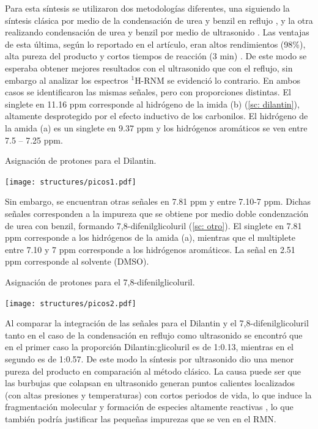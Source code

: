 \documentclass[fleqn,10pt]{SelfArx}
\begin{document}
Para esta síntesis se utilizaron dos metodologías diferentes, una siguiendo la síntesis clásica por medio de la condensación de urea y benzil en reflujo \cite{dunnavant1956}\cite{triovi2015}\cite{safari2010}, y la otra realizando condensación de urea y benzil por medio de ultrasonido \cite{safari2010}.  Las ventajas de esta última, según lo reportado en el artículo, eran altos rendimientos (98\%), alta pureza del producto y cortos tiempos de reacción (3 min) \cite{safari2010}. De este modo se esperaba obtener mejores resultados con el ultrasonido que con el reflujo, sin embargo al analizar los espectros $^1$H-RNM se evidenció lo contrario. En ambos casos se identificaron las mismas señales, pero con proporciones distintas.  El singlete en 11.16 ppm corresponde al hidrógeno de la imida (b) (\autoref{sc: dilantin}), altamente desprotegido por el efecto inductivo de los carbonilos. El hidrógeno de la amida (a) es un singlete en 9.37 ppm y los hidrógenos aromáticos se ven entre 7.5 – 7.25 ppm.
\begin{scheme}[h]
	\centering
	\caption{Asignaci\'on de protones para el Dilantin.}
	\label{sc: dilantin}
	\texttt{[image: structures/picos1.pdf]}
\end{scheme}

Sin embargo, se encuentran otras señales en 7.81 ppm y entre 7.10-7 ppm. Dichas señales corresponden a la impureza que se obtiene por medio doble condenzación de urea con benzil, formando 7,8-difenilglicoluril (\autoref{sc: otro}). El singlete en 7.81 ppm corresponde a los hidrógenos de la amida (a), mientras que el multiplete entre 7.10 y 7 ppm corresponde a los hidrógenos aromáticos. La señal en 2.51 ppm corresponde al solvente (DMSO).
\begin{scheme}[h]
	\centering
	\caption{Asignaci\'on de protones para el 7,8-difenilglicoluril.}
	\label{sc: otro}
	\texttt{[image: structures/picos2.pdf]}
\end{scheme}

Al comparar la integración de las señales para el Dilantin y el 7,8-difenilglicoluril tanto en el caso de la condensación en reflujo como ultrasonido se encontró que en el primer caso la proporción Dilantin:glicoluril es de 1:0.13, mientras en el segundo es de 1:0.57. De este modo la síntesis por ultrasonido dio una menor pureza del producto en comparación al método clásico. La causa puede ser que las burbujas que colapsan en ultrasonido generan puntos calientes localizados (con altas presiones y temperaturas) con cortos periodos de vida, lo que induce la fragmentación molecular y formación de especies altamente reactivas \cite{li2010}, lo que también podría justificar las pequeñas impurezas que se ven en el RMN.
\end{document}
